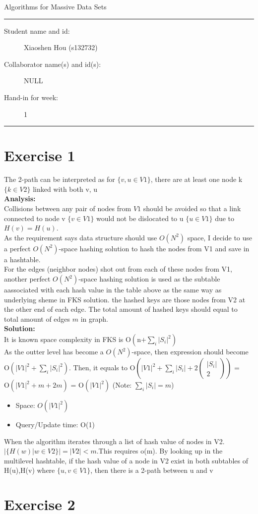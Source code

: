 \documentclass[11pt]{article}
\begin{document}
\begin{center}
{{\Large \sc Algorithms for Massive Data Sets}}
\end{center}
\rule{\textwidth}{1pt}
\begin{description}
\item[Student name and id:] Xiaoshen Hou (s132732)
\item[Collaborator name(s) and id(s):] NULL
\item[Hand-in for week:] 1
\end{description}
\rule{\textwidth}{1pt}


\section*{Exercise 1}

The 2-path can be interpreted as for $\{v, u{\in}V1\}$, there are at least one node k $\{k{\in}V2\}$ linked with both v, u \\
\noindent
\textbf{Analysis:} \\
Collisions between any pair of nodes from $V1$ should be avoided so that a link connected to node v $\{v{\in}V1\}$ would not be dislocated to u $\{u{\in}V1\}$ due to $H(v)=H(u)$. \\ 
As the requirement says data structure should use $O(N^2)$ space, I decide to use a perfect $O(N^2)$-space hashing solution to hash the nodes from V1 and save in a hashtable. \\
For the edges (neighbor nodes) shot out from each of these nodes from V1, another perfect $O(N^2)$-space hashing solution is used as the subtable aassociated with each hash value in the table above as the same way as underlying sheme in FKS solution. the hashed keys are those nodes from V2 at the other end of each edge. The total amount of hashed keys should equal to total amount of edges $m$ in graph.\\
\textbf{Solution:} \\
It is known space complexity in FKS is $\text{O}\left(\text{n+} \displaystyle \sum_{i}|S_i|^2 \right)$\\
As the outter level has become a $O(N^2)$-space, then expression should become $\text{O}\left(|V1|^2+ \displaystyle \sum_{i}|S_i|^2 \right)$. Then, it equals to $\text{O}\left(|V1|^2+ \displaystyle \sum_{i}|S_i|+2\left(\begin{array}{cc}
|S_i|\\2 
\end{array}\right) \right)$ = $\text{O}\left(|V1|^2+ m +2m \right)$ =  $\text{O}(|V1|^2)$ (Note: $\sum_{i}|S_i|=m$) \\
\noindent
\begin{itemize}
    \item 
    Space: $O(|V1|^2)$
    \item 
    Query/Update time: O(1)
\end{itemize}
\noindent
When the algorithm iterates through a list of hash value of nodes in V2. $|\{H(w)|w{\in}V2\}|=|V2|<m$.This requires o(m). By looking up in the multilevel hashtable, if the hash value of a node in V2 exist in both subtables of H(u),H(v) where $\{u,v{\in}V1\}$, then there is a 2-path between u and v

\section*{Exercise 2}
\end{document}
